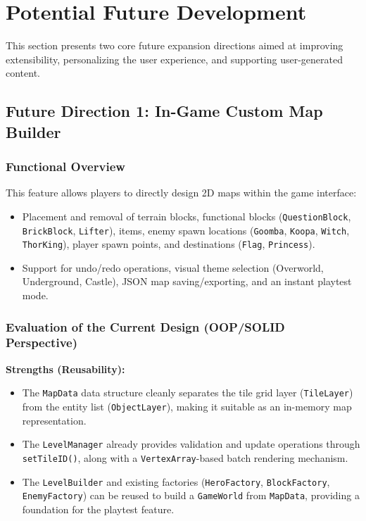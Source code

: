 \section{Potential Future Development}

This section presents two core future expansion directions aimed at improving extensibility, personalizing the user experience, and supporting user-generated content.

\vspace{0.5cm}

\subsection{Future Direction 1: In-Game Custom Map Builder}

\subsubsection{Functional Overview}
This feature allows players to directly design 2D maps within the game interface:
\begin{itemize}
    \item Placement and removal of terrain blocks, functional blocks (\texttt{QuestionBlock}, \texttt{BrickBlock}, \texttt{Lifter}), items, enemy spawn locations (\texttt{Goomba}, \texttt{Koopa}, \texttt{Witch}, \texttt{ThorKing}), player spawn points, and destinations (\texttt{Flag}, \texttt{Princess}).
    \item Support for undo/redo operations, visual theme selection (Overworld, Underground, Castle), JSON map saving/exporting, and an instant playtest mode.
\end{itemize}

\subsubsection{Evaluation of the Current Design (OOP/SOLID Perspective)}
\textbf{Strengths (Reusability):}
\begin{itemize}
    \item The \texttt{MapData} data structure cleanly separates the tile grid layer (\texttt{TileLayer}) from the entity list (\texttt{ObjectLayer}), making it suitable as an in-memory map representation.
    \item The \texttt{LevelManager} already provides validation and update operations through \texttt{setTileID()}, along with a \texttt{VertexArray}-based batch rendering mechanism.
    \item The \texttt{LevelBuilder} and existing factories (\texttt{HeroFactory}, \texttt{BlockFactory}, \texttt{EnemyFactory}) can be reused to build a \texttt{GameWorld} from \texttt{MapData}, providing a foundation for the playtest feature.
\end{itemize}

